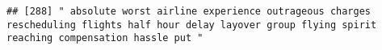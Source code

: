 \documentclass[
]{article}
\begin{document}
\begin{verbatim}
## [288] " absolute worst airline experience outrageous charges rescheduling flights half hour delay layover group flying spirit reaching compensation hassle put "                                                                                                                                                                                                                                                                                                                                                                                                                                                                                                                                                                                                                                                                                                                                                                                                                                                                                                                                                                                                                                                                                                                                                                                                                                                                                                                                                                                                                                                                                                                                                                                                                                      

\end{verbatim}
\end{document}
